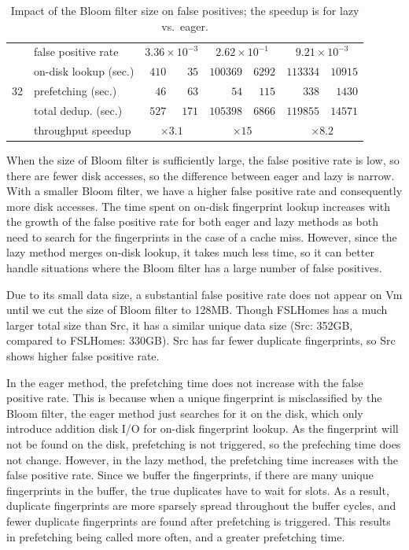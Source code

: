 \documentclass[prodmode,acmtecs]{acmsmall}
\begin{document}
\begin{table}[htp]
\begin{tabular}{llrrrrrr}
\cmidrule(lr){1-1} \cmidrule(lr){2-2} \cmidrule(lr){3-4} \cmidrule(lr){5-6} \cmidrule(lr){7-8}
\multirow{5}{*}{32} & false positive rate & \multicolumn{2}{c}{$3.36\times 10^{-3}$} & \multicolumn{2}{c}{$2.62\times 10^{-1}$} & \multicolumn{2}{c}{$9.21\times 10^{-3}$} \\
& on-disk lookup (sec.)& $410$ & $35$ & $100369$ & $6292$ & $113334$ & $10915$\\
& prefetching (sec.) & $46$ & $63$ & $54$ & $115$ & $338$ & $1430$ \\
& total dedup. (sec.) & $527$ & $171$ & $105398$ & $6866$ & $119855$ & $14571$\\
& throughput speedup & \multicolumn{2}{c}{$\times 3.1$} & \multicolumn{2}{c}{$\times 15$} & \multicolumn{2}{c}{$\times 8.2$} \\

\bottomrule
\end{tabular}
\caption{Impact of the Bloom filter size on false positives; the speedup is for lazy vs.\ eager.}
\label{tab:bloom-filter}
\end{table}

When the size of Bloom filter is sufficiently large, the false positive rate is low, so there are fewer disk accesses, so the difference between eager and lazy is narrow.  With a smaller Bloom filter, we have a higher false positive rate and consequently more disk accesses.  The time spent on on-disk fingerprint lookup increases with the growth of the false positive rate for both eager and lazy methods as both need to search for the fingerprints in the case of a cache miss.  However, since the lazy method merges on-disk lookup, it takes much less time, so it can better handle situations where the Bloom filter has a large number of false positives.  

Due to its small data size, a substantial false positive rate does not appear on Vm until we cut the size of Bloom filter to 128MB. Though FSLHomes has a much larger total size than Src, it has a similar unique data size (Src: 352GB, compared to FSLHomes: 330GB). Src has far fewer duplicate fingerprints, so Src shows higher false positive rate.

In the eager method, the prefetching time does not increase with the false positive rate. This is because when a unique fingerprint is misclassified by the Bloom filter, the eager method just searches for it on the disk, which only introduce addition disk I/O for on-disk fingerprint lookup. As the fingerprint will not be found on the disk, prefetching is not triggered, so the prefeching time does not change.  However, in the lazy method, the prefetching time increases with the false positive rate. Since we buffer the fingerprints, if there are many unique fingerprints in the buffer, the true duplicates have to wait for slots. As a result, duplicate fingerprints are more sparsely spread throughout the buffer cycles, and fewer duplicate fingerprints are found after prefetching is triggered.  This results in prefetching being called more often, and a greater prefetching time.
\end{document}
